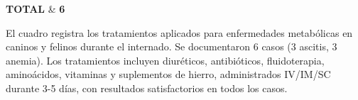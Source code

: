 \begin{landscape}
\begin{longtable}
		\textbf{TOTAL} & \textbf{6} \\

	\end{longtable}
	\vspace{-12pt}\normalsize
	El cuadro registra los tratamientos aplicados para enfermedades metabólicas en caninos y felinos durante el internado. Se documentaron 6 casos (3 ascitis, 3 anemia). Los tratamientos incluyen diuréticos, antibióticos, fluidoterapia, aminoácidos, vitaminas y suplementos de hierro, administrados IV/IM/SC durante 3-5 días, con resultados satisfactorios en todos los casos.

\end{landscape}
